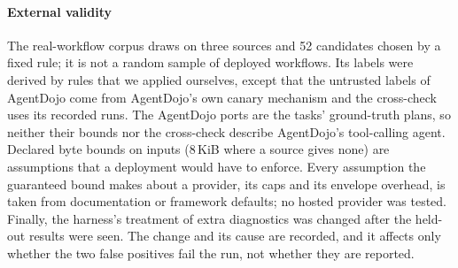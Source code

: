 \paragraph{External validity} The real-workflow corpus draws on three sources and 52
candidates chosen by a fixed rule; it is not a random sample of deployed workflows.
Its labels were derived by rules that we applied ourselves, except that the untrusted
labels of AgentDojo come from AgentDojo's own canary mechanism and the cross-check uses
its recorded runs. The AgentDojo ports are the tasks' ground-truth plans, so neither their
bounds nor the cross-check describe AgentDojo's tool-calling agent. Declared byte bounds
on inputs (8\,KiB where a source gives none) are assumptions that a deployment would
have to enforce. Every assumption the guaranteed bound makes about a provider, its caps
and its envelope overhead, is taken from documentation or framework defaults; no hosted
provider was tested. Finally, the harness's treatment of extra diagnostics was changed
after the held-out results were seen. The change and its cause are recorded, and it
affects only whether the two false positives fail the run, not whether they are
reported.
